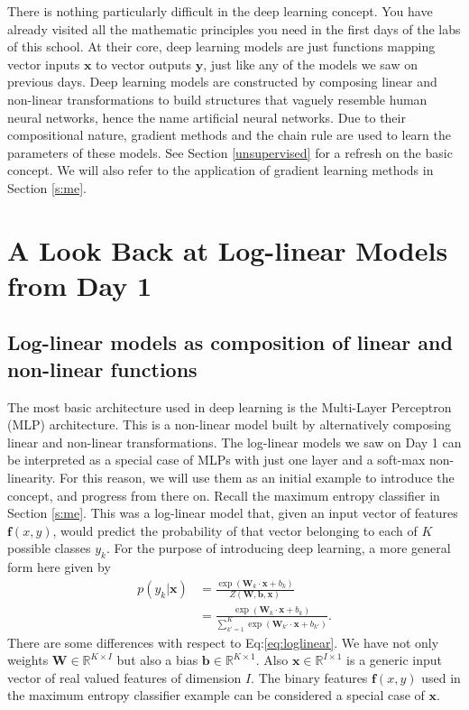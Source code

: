 There is nothing particularly difficult in the deep learning concept. You have
already visited all the mathematic principles you need in the first days of the
labs of this school. At their core, deep learning models are just functions
mapping vector inputs $\mathbf{x}$ to vector outputs $\mathbf{y}$, just like any
of the models we saw on previous days. Deep learning models are constructed by
composing linear and non-linear transformations to build structures that vaguely
resemble human neural networks, hence the name artificial neural networks. Due
to their compositional nature, gradient methods and the chain rule are used to
learn the parameters of these models. See Section \ref{unsupervised} for a
refresh on the basic concept. We will also refer to the application of gradient
learning methods in Section \ref{s:me}. 

\section{A Look Back at Log-linear Models from Day 1} 

\subsection{Log-linear models as composition of linear and non-linear functions}

The most basic architecture used in deep learning is the Multi-Layer Perceptron
(MLP) architecture. This is a non-linear model built by alternatively composing
linear and non-linear transformations. The log-linear models we saw on Day 1
can be interpreted as a special case of MLPs with just one layer and a soft-max
non-linearity. For this reason, we will use them as an initial example to
introduce the concept, and progress from there on. Recall the maximum entropy
classifier in Section \ref{s:me}. This was a log-linear model that, given an
input vector of features $\boldsymbol{f}(x,y)$, would predict the probability
of that vector belonging to each of $K$ possible classes $y_k$. For the purpose
of introducing deep learning, a more general form here given by 
%
\begin{align}
p(y_k|\mathbf{x}) & = \frac{\exp(\mathbf{W}_k \cdot \mathbf{x} + b_k)}{Z(\mathbf{W},\mathbf{b},\mathbf{x})}\nonumber\\ & = \frac{\exp(\mathbf{W}_k \cdot \mathbf{x} + b_k)}{\sum_{k'=1}^K \exp(\mathbf{W}_{k'} \cdot \mathbf{x} + b_{k'})}. 
\label{eq:loglineargen}
\end{align}
%
There are some differences with respect to  Eq:\ref{eq:loglinear}. We have not
only weights $\mathbf{W} \in \mathbb{R}^{K \times I}$ but also a bias
$\mathbf{b} \in \mathbb{R}^{K \times 1}$. Also $\mathbf{x} \in \mathbb{R}^{I
\times 1}$ is a generic input vector of real valued features of dimension $I$.
The binary features $\boldsymbol{f}(x,y)$ used in the maximum entropy
classifier example can be considered a special case of $\mathbf{x}$.    

